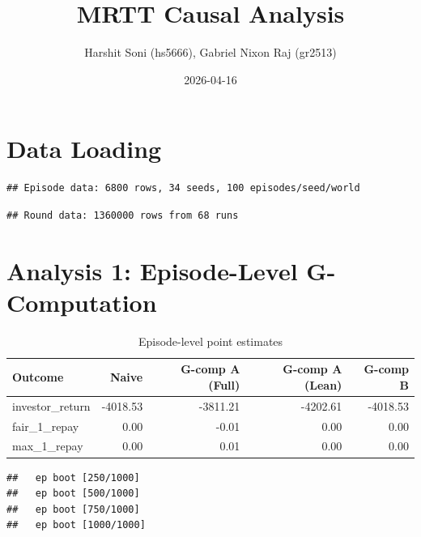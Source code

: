 \documentclass[
]{article}
\title{MRTT Causal Analysis}
\author{Harshit Soni (hs5666), Gabriel Nixon Raj (gr2513)}
\date{2026-04-16}
\begin{document}
\maketitle

{
\setcounter{tocdepth}{2}
\tableofcontents
}
\section{Data Loading}\label{data-loading}

\begin{verbatim}
## Episode data: 6800 rows, 34 seeds, 100 episodes/seed/world
\end{verbatim}

\begin{verbatim}
## Round data: 1360000 rows from 68 runs
\end{verbatim}

\section{Analysis 1: Episode-Level
G-Computation}\label{analysis-1-episode-level-g-computation}

\begingroup\fontsize{10}{12}\selectfont

\begin{longtable}[t]{lrrrr}
\caption{\label{tab:episode-point-estimates}Episode-level point estimates}\\
\toprule
Outcome & Naive & G-comp A (Full) & G-comp A (Lean) & G-comp B\\
\midrule
investor\_return & -4018.53 & -3811.21 & -4202.61 & -4018.53\\
fair\_1\_repay & 0.00 & -0.01 & 0.00 & 0.00\\
max\_1\_repay & 0.00 & 0.01 & 0.00 & 0.00\\
\bottomrule
\end{longtable}
\endgroup{}

\begin{verbatim}
##   ep boot [250/1000]
##   ep boot [500/1000]
##   ep boot [750/1000]
##   ep boot [1000/1000]
\end{verbatim}

\begingroup\fontsize{10}{12}\selectfont
\end{document}
